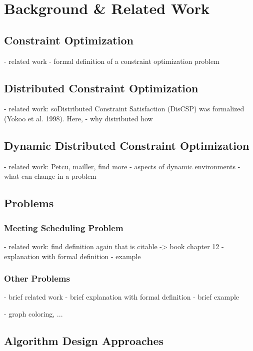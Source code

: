 \chapter{Background \& Related Work}
\section{Constraint Optimization}
    
    - related work
    - formal definition of a constraint optimization problem
    
\section{Distributed Constraint Optimization}

    - related work: soDistributed Constraint Satisfaction (DisCSP) was formalized (Yokoo et al. 1998). Here,
    - why distributed how

\section{Dynamic Distributed Constraint Optimization}
    
    - related work: Petcu, mailler, find more
    - aspects of dynamic environments
    - what can change in a problem

\section{Problems}
\subsection{Meeting Scheduling Problem}
    
    - related work: find definition again that is citable -> book chapter 12
    - explanation with formal definition
    - example

\subsection{Other Problems}
    
    - brief related work
    - brief explanation with formal definition
    - brief example
    
    - graph coloring, ...

\section{Algorithm Design Approaches}
